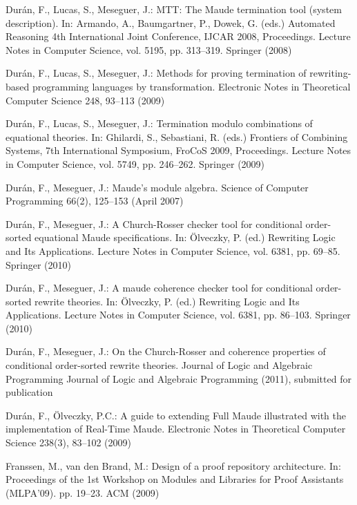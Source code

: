 \documentclass{llncs}
\begin{document}
\begin{thebibliography}{10}
Dur\'{a}n, F., Lucas, S., Meseguer, J.: {MTT}: The {Maude} termination tool
  (system description). In: Armando, A., Baumgartner, P., Dowek, G. (eds.)
  Automated Reasoning 4th International Joint Conference, IJCAR 2008,
  Proceedings. Lecture Notes in Computer Science, vol. 5195, pp. 313--319.
  Springer (2008)

Dur\'{a}n, F., Lucas, S., Meseguer, J.: Methods for proving termination of
  rewriting-based programming languages by transformation. Electronic Notes in
  Theoretical Computer Science  248,  93--113 (2009)

Dur\'an, F., Lucas, S., Meseguer, J.: Termination modulo combinations of
  equational theories. In: Ghilardi, S., Sebastiani, R. (eds.) Frontiers of
  Combining Systems, 7th International Symposium, FroCoS 2009, Proceedings.
  Lecture Notes in Computer Science, vol. 5749, pp. 246--262. Springer (2009)

Dur{\'a}n, F., Meseguer, J.: {M}aude's module algebra. Science of Computer
  Programming  66(2),  125--153 (April 2007)

Dur\'an, F., Meseguer, J.: A {Church-Rosser} checker tool for conditional
  order-sorted equational {Maude} specifications. In: \"Olveczky, P. (ed.)
  Rewriting Logic and Its Applications. Lecture Notes in Computer Science, vol.
  6381, pp. 69--85. Springer (2010)

Dur\'an, F., Meseguer, J.: A maude coherence checker tool for conditional
  order-sorted rewrite theories. In: \"Olveczky, P. (ed.) Rewriting Logic and
  Its Applications. Lecture Notes in Computer Science, vol. 6381, pp. 86--103.
  Springer (2010)

Dur\'{a}n, F., Meseguer, J.: On the {C}hurch-{R}osser and coherence properties
  of conditional order-sorted rewrite theories. Journal of Logic and Algebraic
  Programming Journal of Logic and Algebraic Programming  (2011), submitted for
  publication

Dur\'an, F., \"Olveczky, P.C.: A guide to extending {Full Maude} illustrated
  with the implementation of {Real-Time Maude}. Electronic Notes in Theoretical
  Computer Science  238(3),  83--102 (2009)

Franssen, M., {van den Brand}, M.: Design of a proof repository architecture.
  In: Proceedings of the 1st Workshop on Modules and Libraries for Proof
  Assistants (MLPA'09). pp. 19--23. ACM (2009)


\end{thebibliography}
\end{document}
